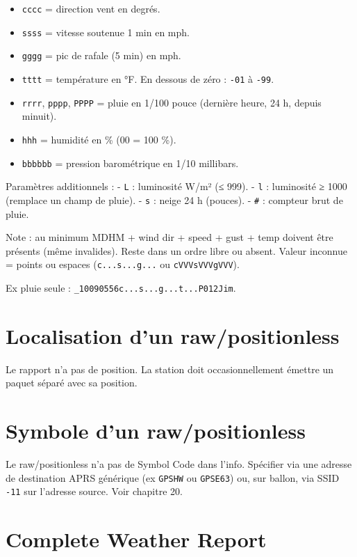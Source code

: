 \begin{itemize}
\tightlist
\item
  \texttt{cccc} = direction vent en degrés.
\item
  \texttt{ssss} = vitesse soutenue 1 min en mph.
\item
  \texttt{gggg} = pic de rafale (5 min) en mph.
\item
  \texttt{tttt} = température en °F. En dessous de zéro : \texttt{-01} à
  \texttt{-99}.
\item
  \texttt{rrrr}, \texttt{pppp}, \texttt{PPPP} = pluie en 1/100 pouce
  (dernière heure, 24 h, depuis minuit).
\item
  \texttt{hhh} = humidité en \% (00 = 100 \%).
\item
  \texttt{bbbbbb} = pression barométrique en 1/10 millibars.
\end{itemize}

Paramètres additionnels : - \texttt{L} : luminosité W/m² (≤ 999). -
\texttt{l} : luminosité ≥ 1000 (remplace un champ de pluie). -
\texttt{s} : neige 24 h (pouces). - \texttt{\#} : compteur brut de
pluie.

Note : au minimum MDHM + wind dir + speed + gust + temp doivent être
présents (même invalides). Reste dans un ordre libre ou absent. Valeur
inconnue = points ou espaces (\texttt{c...s...g...} ou
\texttt{cVVVsVVVgVVV}).

Ex pluie seule : \texttt{\_10090556c...s...g...t...P012Jim}.

\section{Localisation d'un
raw/positionless}\label{localisation-dun-rawpositionless}

Le rapport n'a pas de position. La station doit occasionnellement
émettre un paquet séparé avec sa position.

\section{Symbole d'un
raw/positionless}\label{symbole-dun-rawpositionless}

Le raw/positionless n'a pas de Symbol Code dans l'info. Spécifier via
une adresse de destination APRS générique (ex \texttt{GPSHW} ou
\texttt{GPSE63}) ou, sur ballon, via SSID \texttt{-11} sur l'adresse
source. Voir chapitre 20.

\section{Complete Weather Report}\label{complete-weather-report}

